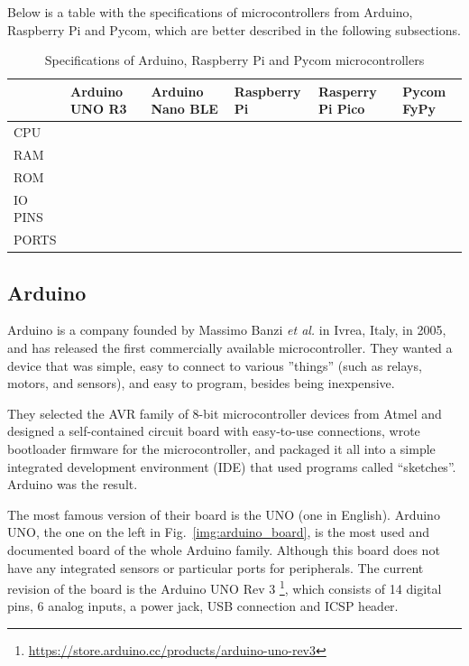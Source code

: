 		Below is a table with the specifications of microcontrollers from Arduino, Raspberry Pi and Pycom, which are better described in the following subsections.
		\begin{table}[tbp]
			\begin{center}
				\begin{tabularx}{\textwidth}{@{}|Y|Y|Y|Y|Y|Y|@{}} 
					\hline
					& Arduino UNO R3 & Arduino Nano BLE & Raspberry Pi & Rasperry Pi Pico & Pycom FyPy \\\hline
						CPU &&&&& \\\hline
						RAM &&&&& \\\hline
						ROM &&&&& \\\hline
						IO PINS &&&&& \\\hline
						PORTS &&&&& \\\hline
				\end{tabularx}
				\caption{Specifications of Arduino, Raspberry Pi and Pycom microcontrollers}
				\label{table:1}
			\end{center}
		\end{table}
	
		\subsection{Arduino}\label{subsec:arduino}
		
			Arduino is a company founded by Massimo Banzi \textit{et al.} in Ivrea, Italy, in 2005, and has released the first commercially available microcontroller.
			They wanted a device that was simple, easy to connect to various ''things'' (such as relays, motors, and sensors), and easy to program, besides being inexpensive.
		
			They selected the AVR family of 8-bit microcontroller devices from Atmel and designed a self-contained circuit board with easy-to-use connections, wrote bootloader firmware for the microcontroller, and packaged it all into a simple integrated development environment (IDE) that used programs called “sketches”. 
			Arduino was the result.
			
			The most famous version of their board is the UNO (one in English).
			Arduino UNO, the one on the left in Fig.~\ref{img:arduino_board}, is the most used and documented board of the whole Arduino family.
			Although this board does not have any integrated sensors or particular ports for peripherals.
			The current revision of the board is the Arduino UNO Rev 3 \footnote{\url{https://store.arduino.cc/products/arduino-uno-rev3}}, which consists of 14 digital pins, 6 analog inputs, a power jack, USB connection and ICSP header.
			
